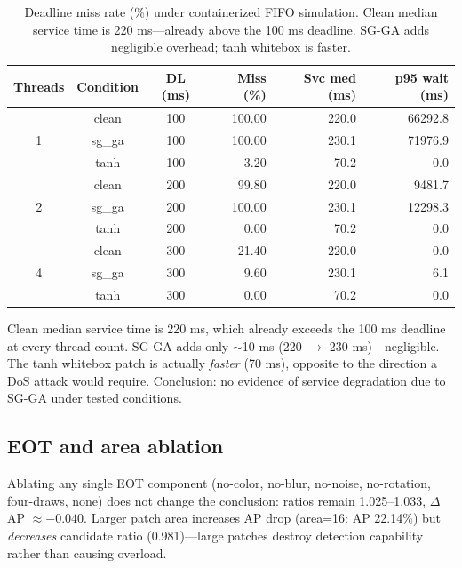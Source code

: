 \documentclass[a4paper,fleqn]{cas-dc}
\begin{document}
\begin{table}[t]
\centering
\caption{Deadline miss rate (\%) under containerized FIFO simulation. Clean median service time is 220 ms---already above the 100 ms deadline. SG-GA adds negligible overhead; tanh whitebox is faster.}
\label{tab:x5_qos}
\small
\begin{tabular}{cccrrr}
\toprule
\textbf{Threads} & \textbf{Condition} & \textbf{DL (ms)} & \textbf{Miss (\%)} & \textbf{Svc med (ms)} & \textbf{p95 wait (ms)} \\
\midrule
\multirow{3}{*}{1} & clean & 100 & 100.00 & 220.0 & 66292.8 \\
 & sg\_ga & 100 & 100.00 & 230.1 & 71976.9 \\
 & tanh & 100 & 3.20 & 70.2 & 0.0 \\
\midrule
\multirow{3}{*}{2} & clean & 200 & 99.80 & 220.0 & 9481.7 \\
 & sg\_ga & 200 & 100.00 & 230.1 & 12298.3 \\
 & tanh & 200 & 0.00 & 70.2 & 0.0 \\
\midrule
\multirow{3}{*}{4} & clean & 300 & 21.40 & 220.0 & 0.0 \\
 & sg\_ga & 300 & 9.60 & 230.1 & 6.1 \\
 & tanh & 300 & 0.00 & 70.2 & 0.0 \\
\bottomrule
\end{tabular}
\end{table}

Clean median service time is 220 ms, which already exceeds the 100 ms deadline at every thread count. SG-GA adds only $\sim$10 ms (220 $\to$ 230 ms)---negligible. The tanh whitebox patch is actually \emph{faster} (70 ms), opposite to the direction a DoS attack would require. Conclusion: no evidence of service degradation due to SG-GA under tested conditions.

\subsection{EOT and area ablation}

Ablating any single EOT component (no-color, no-blur, no-noise, no-rotation, four-draws, none) does not change the conclusion: ratios remain 1.025--1.033, $\Delta$AP $\approx -0.040$. Larger patch area increases AP drop (area=16: AP 22.14\%) but \emph{decreases} candidate ratio (0.981)---large patches destroy detection capability rather than causing overload.

\end{document}

